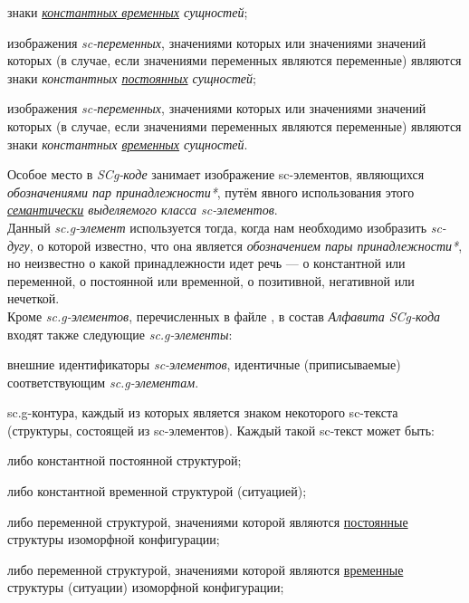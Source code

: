 \begin{SCn}
\begin{scnstruct}
\begin{scnsubstruct}
{\begin{scnitemize}
                    \item знаки \textit{\uline{константных временных} сущностей};
                    \item изображения \textit{sc-переменных}, значениями которых или значениями значений которых (в случае, если значениями переменных являются переменные) являются знаки \textit{константных \uline{постоянных} сущностей};
                    \item изображения \textit{sc-переменных}, значениями которых или значениями значений которых (в случае, если значениями переменных являются переменные) являются знаки \textit{константных \uline{временных} сущностей}.
                \end{scnitemize}
                Особое место в \textit{SCg-коде} занимает изображение sc-элементов, являющихся \textit{обозначениями пар принадлежности*}, путём явного использования этого \textit{\uline{семантически} выделяемого класса sc-элементов}.
                \\Данный \textit{sc.g-элемент} используется тогда, когда нам необходимо изобразить \textit{sc-дугу}, о которой известно, что она является \textit{обозначением пары принадлежности*}, но неизвестно о какой принадлежности идет речь --- о константной или переменной, о постоянной или временной, о позитивной, негативной или нечеткой.
                \\Кроме \textit{sc.g-элементов}, перечисленных в файле , в состав \textit{Алфавита SCg-кода} входят также следующие \textit{sc.g-элементы}:
                \begin{scnitemize}
                    \item внешние идентификаторы \textit{sc-элементов}, идентичные (приписываемые) соответствующим \textit{sc.g-элементам}. 
                    \item sc.g-контура, каждый из которых является знаком некоторого sc-текста (структуры, состоящей из sc-элементов). Каждый такой sc-текст может быть:
                        \begin{scnitemizeii}
                            \item либо константной постоянной структурой;
                            \item либо константной временной структурой (ситуацией);
                            \item либо переменной структурой, значениями которой являются \uline{постоянные} структуры изоморфной  конфигурации;
                            \item либо переменной структурой, значениями которой являются \uline{временные} структуры (ситуации) изоморфной  конфигурации;

\end{scnitemizeii}
\end{scnitemize}}
\end{scnsubstruct}
\end{scnstruct}
\end{SCn}
